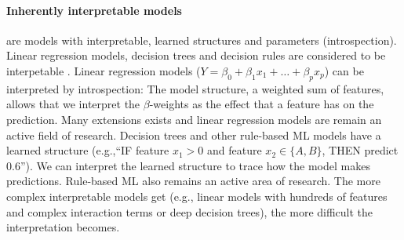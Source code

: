 \documentclass[runningheads]{llncs}
\begin{document}
\paragraph{Inherently interpretable models} are models with interpretable, learned structures and parameters (introspection).
Linear regression models, decision trees and decision rules are considered to be interpetable \cite{freitas2014comprehensible,huysmans2011empirical}.
Linear regression models ($Y = \beta_0 + \beta_1 x_1 + \ldots + \beta_p x_p$) can be interpreted by introspection:
The model structure, a weighted sum of features, allows that we interpret the $\beta$-weights as the effect that a feature has on the prediction.
Many extensions exists and linear regression models are remain an active field of research.
Decision trees and other rule-based ML models have a learned structure (e.g.,\enquote{IF feature $x_1 > 0$ and feature $x_2 \in \{A,B\}$, THEN predict 0.6}).
We can interpret the learned structure to trace how the model makes predictions.
Rule-based ML also remains an active area of research.
The more complex interpretable models get (e.g., linear models with hundreds of features and complex interaction terms or deep decision trees), the more difficult the interpretation becomes.
\end{document}
